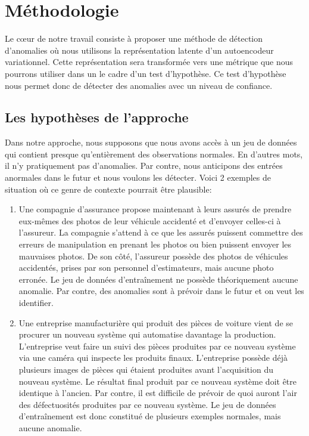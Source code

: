 \chapter{Méthodologie}     %
\label{chap:methodologie}                   %

Le cœur de notre travail consiste à proposer une méthode de détection d'anomalies où nous utilisons la représentation latente d'un autoencodeur variationnel. Cette représentation sera transformée vers une métrique que nous pourrons utiliser dans un le cadre d'un test d'hypothèse. Ce test d'hypothèse nous permet donc de détecter des anomalies avec un niveau de confiance.

\section{Les hypothèses de l'approche}

Dans notre approche, nous supposons que  nous avons accès à un jeu de données qui contient presque qu'entièrement des observations normales. En d'autres mots, il n'y pratiquement pas d'anomalies. Par contre, nous anticipons des entrées anormales dans le futur et nous voulons les détecter. Voici 2 exemples de situation où ce genre de contexte pourrait être plausible:

\begin{enumerate}
	\item Une compagnie d'assurance propose maintenant à leurs assurés de prendre eux-mêmes des photos de leur véhicule accidenté et d'envoyer celles-ci à l'assureur. La compagnie s'attend à ce que les assurés puissent commettre des erreurs de manipulation en prenant les photos ou bien puissent envoyer les mauvaises photos. De son côté, l'assureur possède des photos de véhicules accidentés, prises par son personnel d'estimateurs, mais aucune photo erronée. Le jeu de données d'entraînement ne possède théoriquement aucune anomalie. Par contre, des anomalies sont à prévoir dans le futur et on veut les identifier.
	\item Une entreprise manufacturière qui produit des pièces de voiture vient de se procurer un nouveau système qui automatise davantage la production. L'entreprise veut faire un suivi des pièces produites par ce nouveau système via une caméra qui inspecte les produits finaux. L'entreprise possède déjà plusieurs images de pièces qui étaient produites avant l'acquisition du nouveau système. Le résultat final produit par ce nouveau système doit être identique à l'ancien. Par contre, il est difficile de prévoir de quoi auront l'air des défectuosités produites par ce nouveau système. Le jeu de données d'entraînement est donc constitué de plusieurs exemples normales, mais aucune anomalie.
\end{enumerate}

